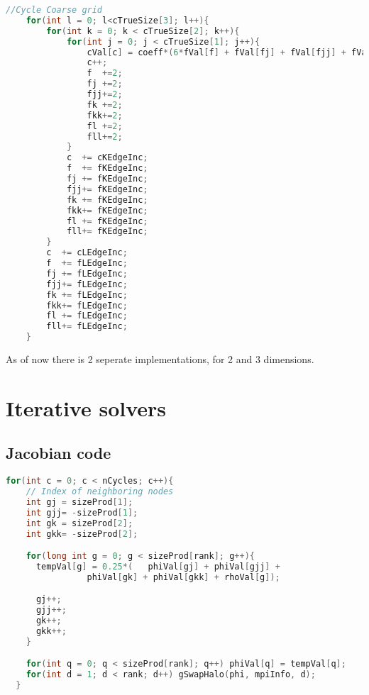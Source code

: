 \newpage
\begin{lstlisting}[language=c, caption = The foor loop doing the calculations]
	//Cycle Coarse grid
	for(int l = 0; l<cTrueSize[3]; l++){
		for(int k = 0; k < cTrueSize[2]; k++){
			for(int j = 0; j < cTrueSize[1]; j++){
				cVal[c] = coeff*(6*fVal[f] + fVal[fj] + fVal[fjj] + fVal[fk] + fVal[fkk] + fVal[fl] + fVal[fll]);
				c++;
				f  +=2;
				fj +=2;
				fjj+=2;
				fk +=2;
				fkk+=2;
				fl +=2;
				fll+=2;
			}
			c  += cKEdgeInc;
			f  += fKEdgeInc;
			fj += fKEdgeInc;
			fjj+= fKEdgeInc;
			fk += fKEdgeInc;
			fkk+= fKEdgeInc;
			fl += fKEdgeInc;
			fll+= fKEdgeInc;
		}
		c  += cLEdgeInc;
		f  += fLEdgeInc;
		fj += fLEdgeInc;
		fjj+= fLEdgeInc;
		fk += fLEdgeInc;
		fkk+= fLEdgeInc;
		fl += fLEdgeInc;
		fll+= fLEdgeInc;
	}
\end{lstlisting}

As of now there is 2 seperate implementations, for 2 and 3 dimensions.



\newpage
\section{Iterative solvers}
\subsection{Jacobian code}
\label{sec:jacobian}

\begin{lstlisting}[language=c, caption = Code snippet 2D jacobian]
  for(int c = 0; c < nCycles; c++){
    // Index of neighboring nodes
    int gj = sizeProd[1];
    int gjj= -sizeProd[1];
    int gk = sizeProd[2];
    int gkk= -sizeProd[2];

    for(long int g = 0; g < sizeProd[rank]; g++){
      tempVal[g] = 0.25*(	phiVal[gj] + phiVal[gjj] +
                phiVal[gk] + phiVal[gkk] + rhoVal[g]);

      gj++;
      gjj++;
      gk++;
      gkk++;
    }

    for(int q = 0; q < sizeProd[rank]; q++) phiVal[q] = tempVal[q];
    for(int d = 1; d < rank; d++) gSwapHalo(phi, mpiInfo, d);
  }
\end{lstlisting}

